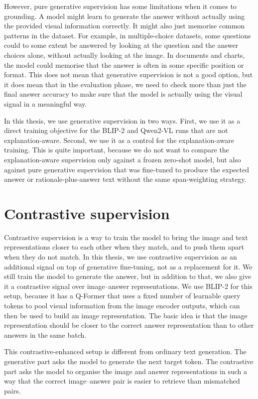 However, pure generative supervision has some limitations when it comes to grounding.
A model might learn to generate the answer without actually using the provided visual information correctly.
It might also just memorise common patterns in the dataset.
For example, in multiple-choice datasets, some questions could to some extent be answered by looking at the question and the answer choices alone,
without actually looking at the image.
In documents and charts, the model could memorise that the answer is often in some specific position or format.
This does not mean that generative supervision is not a good option, but it does mean that in the evaluation phase, we need to check more than just the final answer accuracy
to make sure that the model is actually using the visual signal in a meaningful way.

In this thesis, we use generative supervision in two ways.
First, we use it as a direct training objective for the BLIP-2 and Qwen2-VL runs that are not explanation-aware.
Second, we use it as a control for the explanation-aware training.
This is quite important, because we do not want to compare the explanation-aware supervision only against a frozen zero-shot model,
but also against pure generative supervision that was fine-tuned to produce the expected answer or rationale-plus-answer text without
the same span-weighting strategy. 


\section{Contrastive supervision}
Contrastive supervision is a way to train the model to bring the image and text representations closer to each other when they match,
and to push them apart when they do not match.
In this thesis, we use contrastive supervision as an additional signal on top of generative fine-tuning, not as a replacement for it.
We still train the model to generate the answer, but in addition to that, we also give it a contrastive signal over image--answer representations.
We use BLIP-2 for this setup, because it has a Q-Former that uses a fixed number of learnable query tokens to pool visual information from the image encoder outputs, which can then be used to build an image representation.
The basic idea is that the image representation should be closer to the correct answer representation than to other answers in the same batch.

This contrastive-enhanced setup is different from ordinary text generation.
The generative part asks the model to generate the next target token.
The contrastive part asks the model to organise the image and answer representations in such a way that the correct image--answer pair is easier to retrieve than mismatched pairs.

